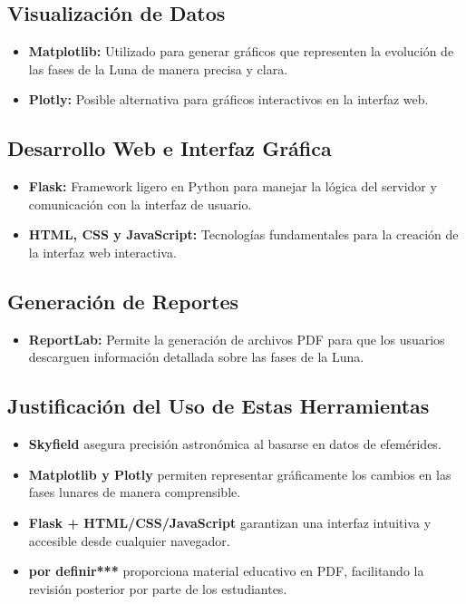 \subsection{Visualización de Datos}
\begin{itemize}
    \item \textbf{Matplotlib:} Utilizado para generar gráficos que representen la evolución de las fases de la Luna de manera precisa y clara.
    \item \textbf{Plotly:} Posible alternativa para gráficos interactivos en la interfaz web.
\end{itemize}

\subsection{Desarrollo Web e Interfaz Gráfica}
\begin{itemize}
    \item \textbf{Flask:} Framework ligero en Python para manejar la lógica del servidor y comunicación con la interfaz de usuario.
    \item \textbf{HTML, CSS y JavaScript:} Tecnologías fundamentales para la creación de la interfaz web interactiva.
\end{itemize}

\subsection{Generación de Reportes}
\begin{itemize}
    \item \textbf{ReportLab:} Permite la generación de archivos PDF para que los usuarios descarguen información detallada sobre las fases de la Luna.
\end{itemize}

\subsection{Justificación del Uso de Estas Herramientas}
\begin{itemize}
    \item \textbf{Skyfield} asegura precisión astronómica al basarse en datos de efemérides.
    \item \textbf{Matplotlib y Plotly} permiten representar gráficamente los cambios en las fases lunares de manera comprensible.
    \item \textbf{Flask + HTML/CSS/JavaScript} garantizan una interfaz intuitiva y accesible desde cualquier navegador.
    \item \textbf{por definir***} proporciona material educativo en PDF, facilitando la revisión posterior por parte de los estudiantes.
\end{itemize}

